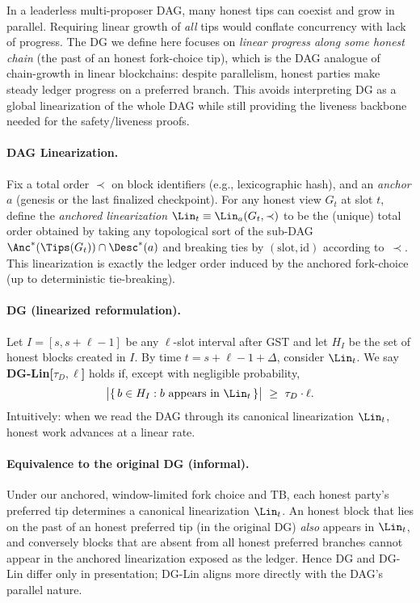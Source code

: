 \begin{remark}
In a leaderless multi-proposer DAG, many honest tips can coexist and grow in parallel.
Requiring linear growth of \emph{all} tips would conflate concurrency with lack of progress.
The DG we define here focuses on \emph{linear progress along some honest chain} (the past of an honest fork-choice tip), which is the DAG analogue of chain-growth in linear blockchains: despite parallelism, honest parties make steady ledger progress on a preferred branch.
This avoids interpreting DG as a global linearization of the whole DAG while still providing the liveness backbone needed for the safety/liveness proofs.
\end{remark}

\paragraph{DAG Linearization.}
Fix a total order $\prec$ on block identifiers (e.g., lexicographic hash), and an \emph{anchor} $a$
(genesis or the last finalized checkpoint). For any honest view $G_t$ at slot $t$, define the
\emph{anchored linearization} $\Lin_t \equiv \Lin_a(G_t,\prec)$ to be the (unique) total order obtained by
taking any topological sort of the sub-DAG $\Anc^*(\Tips(G_t)) \cap \Desc^*(a)$ and breaking ties by
$(\text{slot},\text{id})$ according to~$\prec$. This linearization is exactly the ledger order induced by the
anchored fork-choice (up to deterministic tie-breaking).

\paragraph{DG (linearized reformulation).}
Let $I=[s,s+\ell-1]$ be any $\ell$-slot interval after GST and let $H_I$ be the set of honest blocks
created in $I$. By time $t=s+\ell-1+\Delta$, consider $\Lin_t$. We say \textbf{DG-Lin[$\tau_D,\ell$]}
holds if, except with negligible probability,
\[
\big|\{\,b\in H_I : b \text{ appears in } \Lin_t\,\}\big| \ \ge\ \tau_D\cdot \ell .
\]
Intuitively: when we read the DAG through its canonical linearization $\Lin_t$, honest work advances at
a linear rate.

\paragraph{Equivalence to the original DG (informal).}
Under our anchored, window-limited fork choice and TB, each honest party’s preferred tip determines a
canonical linearization $\Lin_t$. An honest block that lies on the past of an honest preferred tip (in the 
original DG) \emph{also} appears in $\Lin_t$, and conversely blocks that are absent from all honest preferred
branches cannot appear in the anchored linearization exposed as the ledger. Hence DG and DG-Lin differ
only in presentation; DG-Lin aligns more directly with the DAG’s parallel nature.




